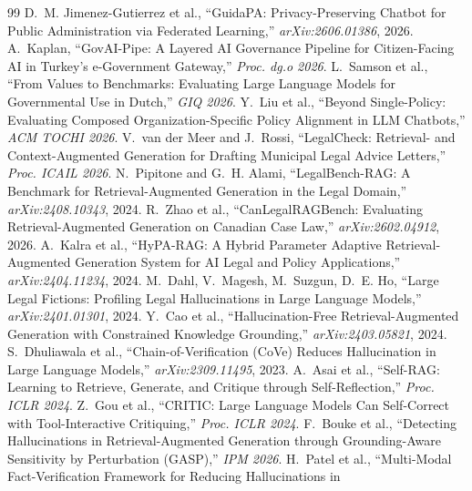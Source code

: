 \documentclass[11pt,a4paper]{article}
\begin{document}
\begin{thebibliography}{99}
\small
{} D.~M. Jimenez-Gutierrez et al., ``GuidaPA: Privacy-Preserving Chatbot for Public
Administration via Federated Learning,'' \textit{arXiv:2606.01386}, 2026.
 A.~Kaplan, ``GovAI-Pipe: A Layered AI Governance Pipeline for Citizen-Facing AI in
Turkey's e-Government Gateway,'' \textit{Proc. dg.o 2026}.
 L.~Samson et al., ``From Values to Benchmarks: Evaluating Large Language Models for
Governmental Use in Dutch,'' \textit{GIQ 2026}.
 Y.~Liu et al., ``Beyond Single-Policy: Evaluating Composed Organization-Specific Policy
Alignment in LLM Chatbots,'' \textit{ACM TOCHI 2026}.
 V.~van der Meer and J.~Rossi, ``LegalCheck: Retrieval- and Context-Augmented
Generation for Drafting Municipal Legal Advice Letters,'' \textit{Proc. ICAIL 2026}.
 N.~Pipitone and G.~H. Alami, ``LegalBench-RAG: A Benchmark for Retrieval-Augmented
Generation in the Legal Domain,'' \textit{arXiv:2408.10343}, 2024.
 R.~Zhao et al., ``CanLegalRAGBench: Evaluating Retrieval-Augmented Generation
on Canadian Case Law,'' \textit{arXiv:2602.04912}, 2026.
 A.~Kalra et al., ``HyPA-RAG: A Hybrid Parameter Adaptive Retrieval-Augmented Generation
System for AI Legal and Policy Applications,'' \textit{arXiv:2404.11234}, 2024.
 M.~Dahl, V.~Magesh, M.~Suzgun, D.~E. Ho, ``Large Legal Fictions: Profiling
Legal Hallucinations in Large Language Models,'' \textit{arXiv:2401.01301}, 2024.
 Y.~Cao et al., ``Hallucination-Free Retrieval-Augmented Generation with Constrained
Knowledge Grounding,'' \textit{arXiv:2403.05821}, 2024.
 S.~Dhuliawala et al., ``Chain-of-Verification (CoVe) Reduces Hallucination in Large
Language Models,'' \textit{arXiv:2309.11495}, 2023.
 A.~Asai et al., ``Self-RAG: Learning to Retrieve, Generate, and Critique through
Self-Reflection,'' \textit{Proc. ICLR 2024}.
 Z.~Gou et al., ``CRITIC: Large Language Models Can Self-Correct with Tool-Interactive
Critiquing,'' \textit{Proc. ICLR 2024}.
 F.~Bouke et al., ``Detecting Hallucinations in Retrieval-Augmented Generation through
Grounding-Aware Sensitivity by Perturbation (GASP),'' \textit{IPM 2026}.
 H.~Patel et al., ``Multi-Modal Fact-Verification Framework for Reducing Hallucinations in

\end{thebibliography}
\end{document}
